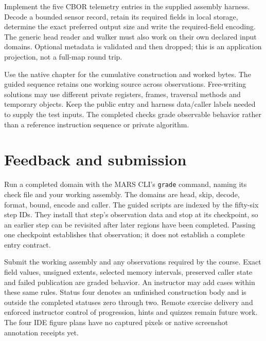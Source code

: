 Implement the five CBOR telemetry entries in the supplied assembly harness. Decode a
bounded sensor record, retain its required fields in local storage, determine the exact
preferred output size and write the required-field encoding. The generic head reader
and walker must also work on their own declared input domains. Optional metadata is
validated and then dropped; this is an application projection, not a full-map round trip.

Use the native chapter for the cumulative construction and worked bytes. The guided
sequence retains one working source across observations. Free-writing solutions may
use different private registers, frames, traversal methods and temporary objects.
Keep the public entry and harness data/caller labels needed to supply the test inputs.
The completed checks grade observable behavior rather than a reference instruction
sequence or private algorithm.








\section*{Feedback and submission}
Run a completed domain with the MARS CLI's \texttt{grade} command, naming its check
file and your working assembly. The domains are head, skip, decode, format, bound,
encode and caller. The guided scripts are indexed by the fifty-six step IDs. They
install that step's observation data and stop at its checkpoint, so an earlier step
can be revisited after later regions have been completed. Passing one checkpoint
establishes that observation; it does not establish a complete entry contract.

Submit the working assembly and any observations required by the course. Exact field
values, unsigned extents, selected memory intervals, preserved caller state and failed
publication are graded behavior. An instructor may add cases within these same rules.
Status four denotes an unfinished construction body and is outside the completed
statuses zero through two. Remote exercise delivery and enforced instructor control
of progression, hints and quizzes remain future work. The four IDE figure plans have
no captured pixels or native screenshot annotation receipts yet.
